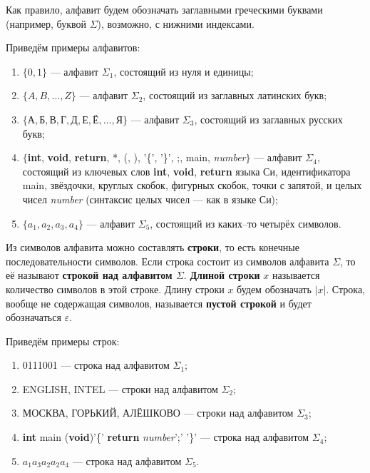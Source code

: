 \documentclass[10pt]{report}
\begin{document}
Как правило, алфавит будем обозначать заглавными греческими буквами (например, буквой $\Sigma$), возможно, с нижними индексами.

Приведём примеры алфавитов:
\begin{enumerate}
    \item $\{0,1\}$ --- алфавит $\Sigma_1$, состоящий из нуля и единицы;

    \item $\{A,B,\dots,Z\}$ --- алфавит $\Sigma_2$, состоящий из заглавных латинских букв;

    \item $\{\text{А},\text{Б},\text{В},\text{Г},\text{Д},\text{Е},\text{Ё},\dots,\text{Я}\}$ --- алфавит $\Sigma_3$, состоящий из заглавных русских букв;

    \item $\{$\textbf{int}, \textbf{void}, \textbf{return}, *, (, ), '\{', '\}', ;, main, \textit{number}$\}$ --- алфавит $\Sigma_4$, состоящий из ключевых слов \textbf{int}, \textbf{void},
    \textbf{return} языка Си, идентификатора main, звёздочки, круглых скобок, фигурных скобок, точки с запятой, и целых чисел \textit{number} (синтаксис целых чисел --- как в языке Си);

    \item $\{a_1,a_2,a_3,a_4\}$ --- алфавит $\Sigma_5$, состоящий из каких--то четырёх символов.
\end{enumerate}

Из символов алфавита можно составлять \textbf{строки}, то есть конечные последовательности символов. Если строка состоит из символов алфавита $\Sigma$, то её называют \textbf{строкой над
    алфавитом $\Sigma$}. \textbf{Длиной строки} $x$ называется количество символов в этой строке. Длину строки $x$ будем обозначать $|x|$. Строка, вообще не содержащая символов, называется
\textbf{пустой строкой} и будет обозначаться $\varepsilon$.

Приведём примеры строк:
\begin{enumerate}
    \item 0111001 --- строка над алфавитом $\Sigma_1$;

    \item ENGLISH, INTEL --- строки над алфавитом $\Sigma_2$;

    \item МОСКВА, ГОРЬКИЙ, АЛЁШКОВО --- строки над алфавитом $\Sigma_3$;

    \item \textbf{int} main (\textbf{void})'\{' \textbf{return} \textit{number}';' '\}' ---
    строка над алфавитом $\Sigma_4$;

    \item $a_1a_3a_2a_2a_4$ --- строка над алфавитом $\Sigma_5$.
\end{enumerate}
\end{document}

